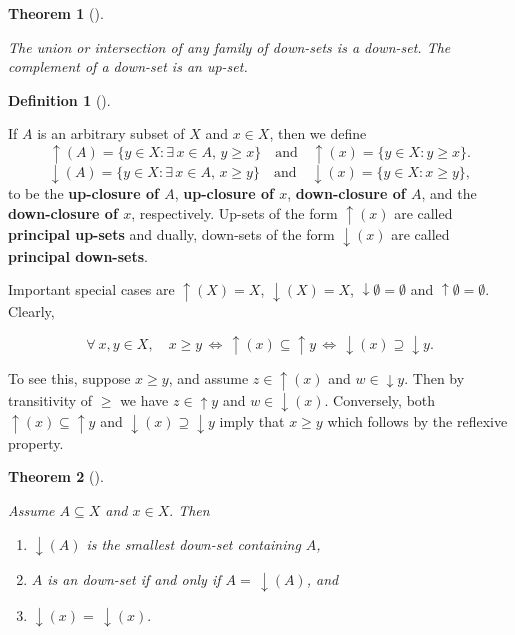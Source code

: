 \documentclass[
  letterpaper,
  10pt,
  reqno,
  twopage,
  openany]{book}
\providecommand{\tightlist}{%
  \setlength{\itemsep}{0pt}\setlength{\parskip}{0pt}}\usepackage{longtable,booktabs,array}
\theoremstyle{plain}
\theoremstyle{definition}
\theoremstyle{definition}
\newtheorem{definition}{Definition}[chapter]
\theoremstyle{definition}
\theoremstyle{plain}
\theoremstyle{plain}
\newtheorem{theorem}{Theorem}[chapter]
\theoremstyle{remark}
\begin{document}
\leavevmode{}%
\begin{theorem}[]\label{thm-union-intersection}

The union or intersection of any family of down-sets is a down-set. The
complement of a down-set is an up-set.

\end{theorem}

\leavevmode{}%
\begin{definition}[]\label{def-up-closure}

If \(A\) is an arbitrary subset of \(X\) and \(x\in X\), then we define
\[
{\uparrow}(A)=\{y\in X : \exists\, x\in A,\, y\geq x\}\quad \text{and} \quad  {\uparrow}(x)=\{y\in X :  y\geq x\}.
\] \[
{\downarrow}(A)=\{y\in X : \exists\, x\in A,\, x\geq y\}
\quad \text{and} \quad 
{\downarrow}(x)=\{y\in X : x\geq y\},
\] to be the  \textbf{up-closure of \(A\)},
 \textbf{up-closure of \(x\)},
 \textbf{down-closure of \(A\)}, and the
 \textbf{down-closure of \(x\)},
respectively. Up-sets of the form \({\uparrow}(x)\) are called
 \textbf{principal up-sets} and dually,
down-sets of the form \({\downarrow}(x)\) are called
 \textbf{principal down-sets}.

\end{definition}

Important special cases are \({\uparrow}(X)=X\), \({\downarrow}(X)=X\),
\({\downarrow}{\emptyset}=\emptyset\) and
\({\uparrow}{\emptyset}=\emptyset.\) Clearly,

\begin{equation}
\label{isoequiv1}
\forall \ x,y\in X, \quad x\geq y 
\, \Longleftrightarrow \,
{\uparrow}(x)\subseteq {\uparrow}{y}
\, \Longleftrightarrow \,
{\downarrow}(x)\supseteq {\downarrow}{y}.
\end{equation}

To see this, suppose \(x\geq y\), and assume \(z\in {\uparrow}(x)\) and
\(w\in {\downarrow}{y}.\) Then by transitivity of \(\geq\) we have
\(z\in {\uparrow}{y}\) and \(w\in {\downarrow}(x).\) Conversely, both
\({\uparrow}(x)\subseteq {\uparrow}{y}\) and
\({\downarrow}(x)\supseteq {\downarrow}{y}\) imply that \(x\geq y\)
which follows by the reflexive property.

\leavevmode{}%
\begin{theorem}[]\label{thm-basicpos}

Assume \(A\subseteq X\) and \(x\in X.\) Then

\begin{enumerate}
\def\labelenumi{\arabic{enumi}.}
\tightlist
\item
  \({\downarrow}(A)\) is the smallest down-set containing \(A\),
\item
  \(A\) is an down-set if and only if \(A=\, {\downarrow}(A)\), and
\item
  \({\downarrow}(x)=\, {\downarrow}(x).\)
\end{enumerate}

\end{theorem}
\end{document}

